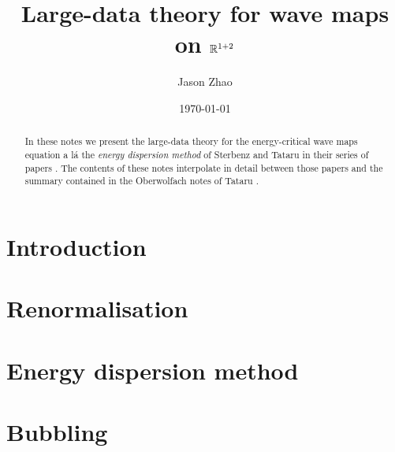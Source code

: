 \documentclass[reqno]{amsart}
\title
{
	Large-data theory for wave maps on $\mathbb R^{1 + 2}$
}
\author{Jason Zhao}
\date{\today}
\begin{document}
\maketitle

\begin{abstract}
	In these notes we present the large-data theory for the energy-critical wave maps equation a l\'a the \textit{energy dispersion method} of Sterbenz and Tataru in their series of papers	\cite{SterbenzTataru2010a, SterbenzTataru2010}.
The contents of these notes interpolate in detail between those papers and the summary contained in the Oberwolfach notes of Tataru \cite[Geometric Wave Equations]{KochEtAl2014}. 
\end{abstract}

\tableofcontents

\section{Introduction}


\section{Renormalisation}


\section{Energy dispersion method}


\section{Bubbling}




\end{document}
